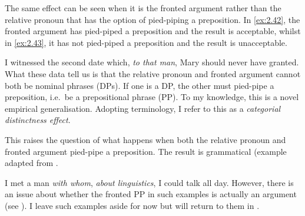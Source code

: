 \documentclass[output=paper]{langsci/langscibook}
\begin{document}
\ea\label{ex:2.41}
    \z
\z
The same effect can be seen when it is the fronted argument rather than the
relative pronoun that has the option of pied-piping a preposition. In \eqref{ex:2.42}, the
fronted argument has pied-piped a preposition and the result is acceptable,
whilst in \eqref{ex:2.43}, it has not pied-piped a preposition and the result is
unacceptable.

\ea\label{ex:2.42}
    I witnessed the second date which, \textit{to that man}, Mary should never have granted.
\label{ex:2.43}
\z
What these data tell us is that the relative pronoun and fronted argument
cannot both be nominal phrases (DPs). If one is a DP, the other must pied-pipe
a preposition, i.e.\ be a prepositional phrase (PP). To my knowledge, this is a
novel empirical generalisation. Adopting  terminology, I refer
to this as a \emph{categorial distinctness effect}.

This raises the question of what happens when both the relative pronoun and
fronted argument pied-pipe a preposition. The result is grammatical (example
adapted from \textcite{Totsuka2014}.

\ea\label{ex:2.44}
    I met a man \textit{with whom}, \textit{about linguistics}, I could talk all day.
\z
However, there is an issue about whether the fronted PP in such examples is
actually an argument (see \citealt[294, 322--325]{Rizzi1997}). I leave such
examples aside for now but will return to them in .\largerpage
\end{document}
